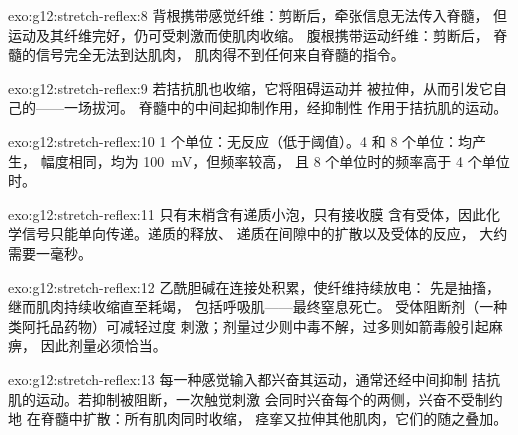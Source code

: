 \begin{solution}{exo:g12:stretch-reflex:8}
背根携带感觉纤维：剪断后，牵张信息无法传入脊髓，
但运动及其纤维完好，仍可受刺激而使肌肉收缩。
腹根携带运动纤维：剪断后，
脊髓的信号完全无法到达肌肉，
肌肉得不到任何来自脊髓的指令。
\end{solution}

\begin{solution}{exo:g12:stretch-reflex:9}
若拮抗肌也收缩，它将阻碍运动并
被拉伸，从而引发它自己的——一场拔河。
脊髓中的中间起抑制作用，经抑制性
作用于拮抗肌的运动。
\end{solution}

\begin{solution}{exo:g12:stretch-reflex:10}
1 个单位：无反应（低于阈值）。4 和 8 个单位：均产生，
幅度相同，均为 \qty{100}{mV}，但频率较高，
且 8 个单位时的频率高于 4 个单位时。
\end{solution}

\begin{solution}{exo:g12:stretch-reflex:11}
只有末梢含有递质小泡，只有接收膜
含有受体，因此化学信号只能单向传递。递质的释放、
递质在间隙中的扩散以及受体的反应，
大约需要一毫秒。
\end{solution}

\begin{solution}{exo:g12:stretch-reflex:12}
乙酰胆碱在连接处积累，使纤维持续放电：
先是抽搐，继而肌肉持续收缩直至耗竭，
包括呼吸肌——最终窒息死亡。
受体阻断剂（一种类阿托品药物）可减轻过度
刺激；剂量过少则中毒不解，过多则如箭毒般引起麻痹，
因此剂量必须恰当。
\end{solution}

\begin{solution}{exo:g12:stretch-reflex:13}
每一种感觉输入都兴奋其运动，通常还经中间抑制
拮抗肌的运动。若抑制被阻断，一次触觉刺激
会同时兴奋每个的两侧，兴奋不受制约地
在脊髓中扩散：所有肌肉同时收缩，
痉挛又拉伸其他肌肉，它们的随之叠加。
\end{solution}

